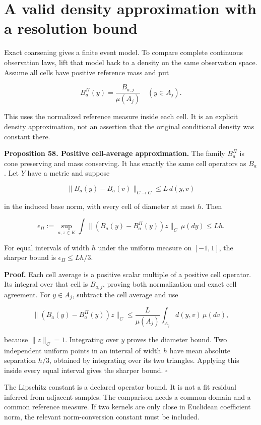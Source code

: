 \section{A valid density approximation with a resolution bound}\label{LSM:a-valid-density-approximation-with-a-resolution-bound}

Exact coarsening gives a finite event model. To compare complete
continuous observation laws, lift that model back to a density on the
same observation space. Assume all cells have positive reference mass
and put

\[
B_a^\Pi(y)=\frac{B_{a,j}}{\mu(A_j)}\quad(y\in A_j).
\]

This uses the normalized reference measure inside each cell. It is an
explicit density approximation, not an assertion that the original
conditional density was constant there.

\textbf{Proposition 58. Positive cell-average approximation.} The family
\(B_a^\Pi\) is cone preserving and mass conserving. It has exactly the
same cell operators as \(B_a\). Let \(Y\) have a metric and suppose

\[
\|B_a(y)-B_a(v)\|_{C\to C}\leq L\,d(y,v)
\]

in the induced base norm, with every cell of diameter at most \(h\).
Then

\[
\epsilon_\Pi:=\sup_{a,z\in K}\int
\|(B_a(y)-B_a^\Pi(y))z\|_C\,\mu(dy)
\leq Lh.
\]

For equal intervals of width \(h\) under the uniform measure on
\([-1,1]\), the sharper bound is \(\epsilon_\Pi\leq Lh/3\).

\textbf{Proof.} Each cell average is a positive scalar multiple of a
positive cell operator. Its integral over that cell is \(B_{a,j}\),
proving both normalization and exact cell agreement. For \(y\in A_j\),
subtract the cell average and use

\[
\|(B_a(y)-B_a^\Pi(y))z\|_C
\leq\frac{L}{\mu(A_j)}\int_{A_j}d(y,v)\,\mu(dv),
\]

because \(\|z\|_C=1\). Integrating over \(y\) proves the diameter bound.
Two independent uniform points in an interval of width \(h\) have mean
absolute separation \(h/3\), obtained by integrating over its two
triangles. Applying this inside every equal interval gives the sharper
bound. \(\square\)

The Lipschitz constant is a declared operator bound. It is not a fit
residual inferred from adjacent samples. The comparison needs a common
domain and a common reference measure. If two kernels are only close in
Euclidean coefficient norm, the relevant norm-conversion constant must
be included.

